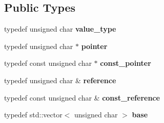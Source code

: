 \subsection*{Public Types}
\begin{DoxyCompactItemize}
\item 
typedef unsigned char {\bfseries value\+\_\+type}\hypertarget{class_base_1_1_object_id_a2a6b8719e9bd362d3cae8a901d238f6f}{}\label{class_base_1_1_object_id_a2a6b8719e9bd362d3cae8a901d238f6f}

\item 
typedef unsigned char $\ast$ {\bfseries pointer}\hypertarget{class_base_1_1_object_id_a36a06bae51c88c5893592b28bd9311e5}{}\label{class_base_1_1_object_id_a36a06bae51c88c5893592b28bd9311e5}

\item 
typedef const unsigned char $\ast$ {\bfseries const\+\_\+pointer}\hypertarget{class_base_1_1_object_id_a1ce45b4d8cec8780cf96e8aa9b921930}{}\label{class_base_1_1_object_id_a1ce45b4d8cec8780cf96e8aa9b921930}

\item 
typedef unsigned char \& {\bfseries reference}\hypertarget{class_base_1_1_object_id_a486ec6587bbbd140dd776281788e98ee}{}\label{class_base_1_1_object_id_a486ec6587bbbd140dd776281788e98ee}

\item 
typedef const unsigned char \& {\bfseries const\+\_\+reference}\hypertarget{class_base_1_1_object_id_a0a971f0617804dc1e107865f3bb473d3}{}\label{class_base_1_1_object_id_a0a971f0617804dc1e107865f3bb473d3}

\item 
typedef std\+::vector$<$ unsigned char $>$ {\bfseries base}\hypertarget{class_base_1_1_object_id_af6e0e53cd168c8de532d458eedefba53}{}\label{class_base_1_1_object_id_af6e0e53cd168c8de532d458eedefba53}

\end{DoxyCompactItemize}
